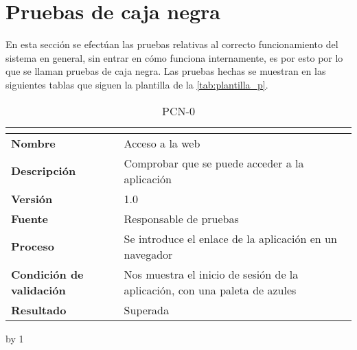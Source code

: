 \section{Pruebas de caja negra}\label{sec:pruebas-de-caja-negra}
En esta sección se efectúan las pruebas relativas al correcto funcionamiento del sistema en general, sin entrar en cómo funciona internamente, es por esto por lo que se llaman pruebas de caja negra. Las pruebas hechas se muestran en las siguientes tablas que siguen la plantilla de la \autoref{tab:plantilla_p}.

\newcount\pcn
{}
\begin{table}[H]
	\caption{PCN-0\number\pcn}
	\begin{tabular}{|l|p{}|}
		\hline
		\multicolumn{2}{|c|}{\cellcolor[HTML]{BFBFBF}{\color[HTML]{000000} \textbf{PCN-0\number\pcn}}} \\ \hline
		\textbf{Nombre}                  & Acceso a la web                                                            \\ \hline
		\textbf{Descripción}             & Comprobar que se puede acceder a la aplicación                             \\ \hline
		\textbf{Versión}                 & 1.0                                                                        \\ \hline
		\textbf{Fuente}                  & Responsable de pruebas                                                     \\ \hline
		\textbf{Proceso}                 & Se introduce el enlace de la aplicación en un navegador                    \\ \hline
		\textbf{Condición de validación} & Nos muestra el inicio de sesión de la aplicación, con una paleta de azules \\ \hline
		\textbf{Resultado}               & Superada                                                                   \\ \hline
	\end{tabular}
\end{table}
\advance\pcn by 1
